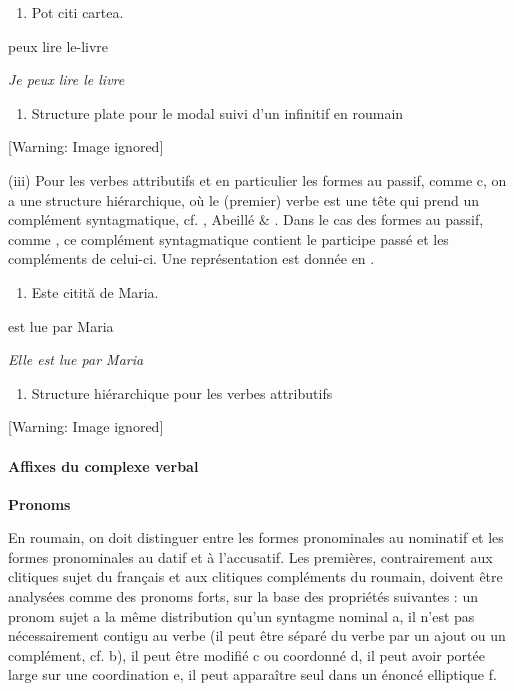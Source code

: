 \begin{enumerate}
\item \label{bkm:Ref299285753}Pot citi cartea.


\end{enumerate}
  peux lire\textsc{} le-livre

  \textit{Je peux lire le livre}    


\begin{enumerate}
\item \label{bkm:Ref299285785}Structure plate pour le modal suivi d'un infinitif en roumain


\end{enumerate}
{   [Warning: Image ignored] %
} 

(iii) Pour les verbes attributifs et en particulier les formes au passif, comme c, on a une structure hiérarchique, où le (premier) verbe est une tête qui prend un complément syntagmatique, cf. \citet{Barbu1999}, Abeillé \& \citet{Godard2003}. Dans le cas des formes au passif, comme , ce complément syntagmatique contient le participe passé et les compléments de celui-ci. Une représentation est donnée en . 


\begin{enumerate}
\item \label{bkm:Ref299286510}Este citită de  Maria.


\end{enumerate}
  est  lue  par Maria

  \textit{Elle est lue par Maria}  


\begin{enumerate}
\item \label{bkm:Ref299286745}Structure hiérarchique pour les verbes attributifs


\end{enumerate}
{   [Warning: Image ignored] %
} 

\paragraph[Affixes du complexe verbal]{Affixes du complexe verbal}
{\bfseries
Pronoms}

En roumain, on doit distinguer entre les formes pronominales au nominatif et les formes pronominales au datif et à l'accusatif. Les premières, contrairement aux clitiques sujet du français et aux clitiques compléments du roumain, doivent être analysées comme des pronoms forts, sur la base des propriétés suivantes : un pronom sujet a la même distribution qu'un syntagme nominal a, il n'est pas nécessairement contigu au verbe (il peut être séparé du verbe par un ajout ou un complément, cf. b), il peut être modifié c ou coordonné d, il peut avoir portée large sur une coordination e, il peut apparaître seul dans un énoncé elliptique f. 


